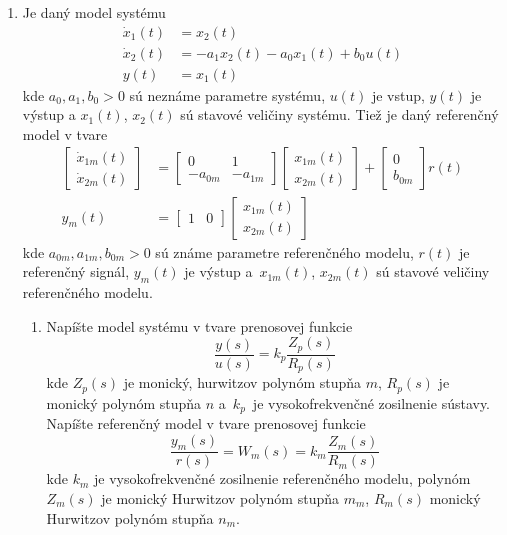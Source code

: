 ﻿\documentclass[a4paper, 10pt, ]{article}
\begin{document}
\begin{enumerate}
	\item Je daný model systému
	\begin{align*}
		\dot{x}_1(t) &= x_2(t) \\
		\dot{x}_2(t) &= -a_1 x_2(t) - a_0 x_1(t) + b_0 u(t) \\
		y(t) & = x_1(t)
	\end{align*}
	kde $a_0, a_1, b_0 > 0$ sú neznáme parametre systému, $u(t)$ je vstup, $y(t)$ je výstup a $x_1(t)$, $x_2(t)$ sú stavové veličiny systému. Tiež je daný referenčný model v tvare
	\begin{align*}
		\begin{bmatrix}
			\dot{x}_{1m}(t) \\ \dot{x}_{2m}(t)
		\end{bmatrix}
		&=
		\begin{bmatrix}
			0 & 1 \\ -a_{0m} & -a_{1m}
		\end{bmatrix}
		\begin{bmatrix}
			x_{1m}(t)  \\ x_{2m}(t)
		\end{bmatrix}
		+
		\begin{bmatrix}
			0  \\  b_{0m}
		\end{bmatrix}
		r(t) \\
		y_m(t)
		&=
		\begin{bmatrix}
			1 & 0
		\end{bmatrix}
		\begin{bmatrix}
			x_{1m}(t)  \\ x_{2m}(t)
		\end{bmatrix}
	\end{align*}
	kde $a_{0m}, a_{1m}, b_{0m} > 0$ sú známe parametre referenčného modelu, $r(t)$ je referenčný signál, $y_m(t)$ je výstup a~$x_{1m}(t)$, $x_{2m}(t)$ sú stavové veličiny referenčného modelu.
	\begin{enumerate}
		\item Napíšte model systému v tvare prenosovej funkcie \label{odvodtePrenosFcn}
		\begin{equation*}
			\frac{y(s)}{u(s)}
			=
			k_p
			\frac{Z_p(s)}{R_p(s)}
		\end{equation*}
		kde $Z_p(s)$ je monický, hurwitzov polynóm stupňa $m$, $R_p(s)$ je monický polynóm stupňa $n$ a~$k_p$~je  vysokofrekvenčné zosilnenie sústavy. Napíšte referenčný model v tvare prenosovej funkcie
		\begin{equation*}
			\frac{y_m(s)}{r(s)}
			=
			W_m(s)
			=
			k_m
			\frac{Z_m(s)}{R_m(s)}
		\end{equation*}
		kde $k_m$ je vysokofrekvenčné zosilnenie referenčného modelu, polynóm $Z_m(s)$ je monický Hurwitzov polynóm stupňa $m_m$, $R_m(s)$ monický Hurwitzov polynóm stupňa $n_m$.


\end{enumerate}
\end{enumerate}
\end{document}
